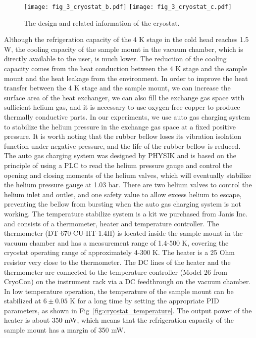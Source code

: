 \begin{figure}
    \centering
    {\texttt{[image: fig\_3\_cryostat\_b.pdf]}}
    {\texttt{[image: fig\_3\_cryostat\_c.pdf]}}
    \caption{The design and related information of the cryostat.}
    \label{fig:cryostat}
\end{figure}

Although the refrigeration capacity of the 4 K stage in the cold head reaches 1.5 W, the cooling capacity of the sample mount in the vacuum chamber, which is directly available to the user, is much lower. The reduction of the cooling capacity comes from the heat conduction between the 4 K stage and the sample mount and the heat leakage from the environment. In order to improve the heat transfer between the 4 K stage and the sample mount, we can increase the surface area of the heat exchanger, we can also fill the exchange gas space with sufficient helium gas, and it is necessary to use oxygen-free copper to produce thermally conductive parts. In our experiments, we use auto gas charging system to stabilize the helium pressure in the exchange gas space at a fixed positive pressure. It is worth noting that the rubber bellow loses its vibration isolation function under negative pressure, and the life of the rubber bellow is reduced. The auto gas charging system was designed by PHYSIK and is based on the principle of using a PLC to read the helium pressure gauge and control the opening and closing moments of the helium valves, which will eventually stabilize the helium pressure gauge at 1.03 bar. There are two helium valves to control the helium inlet and outlet, and one safety value to allow excess helium to escape, preventing the bellow from bursting when the auto gas charging system is not working. The temperature stabilize system is a kit we purchased from Janis Inc. and consists of a thermometer, heater and temperature controller. The thermometer (DT-670-CU-HT-1.4H) is located inside the sample mount in the vacuum chamber and has a measurement range of 1.4-500 K, covering the cryostat operating range of approximately 4-300 K. The heater is a 25 Ohm resistor very close to the thermometer. The DC lines of the heater and the thermometer are connected to the temperature controller (Model 26 from CryoCon) on the instrument rack via a DC feedthrough on the vacuum chamber. In low temperature operation, the temperature of the sample mount can be stabilized at $6 \pm 0.05$ K for a long time by setting the appropriate PID parameters, as shown in Fig~\ref{fig:cryostat_temperature}. The output power of the heater is about 350 mW, which means that the refrigeration capacity of the sample mount has a margin of 350 mW.

